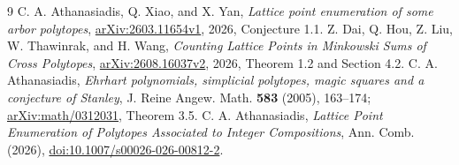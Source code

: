 \documentclass[11pt]{article}
\begin{document}
\begin{thebibliography}{9}
 C. A. Athanasiadis, Q. Xiao, and X. Yan,
\emph{Lattice point enumeration of some arbor polytopes},
\href{https://arxiv.org/abs/2603.11654}{arXiv:2603.11654v1}, 2026,
Conjecture 1.1.
 Z. Dai, Q. Hou, Z. Liu, W. Thawinrak, and H. Wang,
\emph{Counting Lattice Points in Minkowski Sums of Cross Polytopes},
\href{https://arxiv.org/abs/2608.16037}{arXiv:2608.16037v2}, 2026,
Theorem 1.2 and Section 4.2.
 C. A. Athanasiadis,
\emph{Ehrhart polynomials, simplicial polytopes, magic squares and
a conjecture of Stanley}, J. Reine Angew. Math. \textbf{583} (2005),
163--174; \href{https://arxiv.org/abs/math/0312031}{arXiv:math/0312031},
Theorem 3.5.
 C. A. Athanasiadis,
\emph{Lattice Point Enumeration of Polytopes Associated to Integer
Compositions}, Ann. Comb. (2026),
\href{https://doi.org/10.1007/s00026-026-00812-2}{doi:10.1007/s00026-026-00812-2}.
\end{thebibliography}
\end{document}
